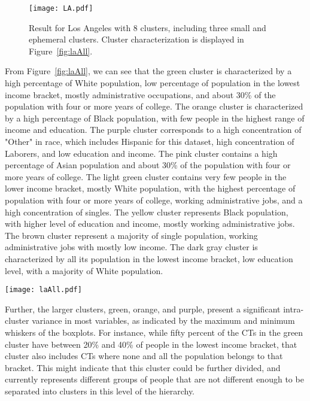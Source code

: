 \begin{figure}
    \centering 
    \texttt{[image: LA.pdf]}
    \caption{Result for Los Angeles with 8 clusters, including three small and
        ephemeral clusters. Cluster characterization is displayed
        in Figure~\ref{fig:laAll}.\label{fig:la}}
\end{figure}

From Figure~\ref{fig:laAll}, we can see that the green cluster is characterized by
a high percentage of White population, low percentage of population in the
lowest income bracket, mostly administrative occupations, and about 30\% of the
population with four or more years of college. The orange cluster is
characterized by a high percentage of Black population, with few people in the
highest range of income and education. The purple cluster corresponds to a high
concentration of "Other" in race, which includes Hispanic for this dataset, high
concentration of Laborers, and low education and income. The pink cluster
contains a high percentage of Asian population and about 30\% of the population
with four or more years of college. The light green cluster contains very few
people in the lower income bracket, mostly White population, with the highest
percentage of population with four or more years of college, working
administrative jobs, and a high concentration of singles. The yellow cluster
represents Black population, with higher level of education and income, mostly
working administrative jobs. The brown cluster represent a majority of single
population, working administrative jobs with mostly low income. The dark gray
cluster is characterized by all its population in the lowest income bracket, low
education level, with a majority of White population.

\begin{figure*}
    \centering 
    \texttt{[image: laAll.pdf]}
    \caption{Full characterization of the eight clusters found for LA. The red
     rectangles indicate the most relevant aspects for each
     cluster.\label{fig:laAll}}
\end{figure*}

Further, the larger clusters, green, orange, and purple, present a significant
intra-cluster variance in most variables, as indicated by the maximum and
minimum whiskers of the boxplots. For instance, while fifty percent of the CTs
in the green cluster have between 20\% and 40\% of people in the lowest income
bracket, that cluster also includes CTs where none and all the population
belongs to that bracket. This might indicate that this cluster could be further
divided, and currently represents different groups of people that are not
different enough to be separated into clusters in this level of the hierarchy.


